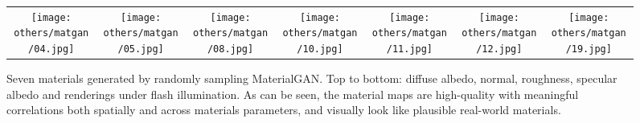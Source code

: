 \setlength{\resLen}{.13\columnwidth}
\begin{figure}[t]
	\addtolength{\tabcolsep}{-4pt}
	\begin{tabular}{ccccccc}
		\texttt{[image: others/matgan/04.jpg]} &
		\texttt{[image: others/matgan/05.jpg]} &
		\texttt{[image: others/matgan/08.jpg]} &
		\texttt{[image: others/matgan/10.jpg]} &
		\texttt{[image: others/matgan/11.jpg]} &
		\texttt{[image: others/matgan/12.jpg]} &
		\texttt{[image: others/matgan/19.jpg]}
	\end{tabular}
	\caption{Seven materials generated by randomly sampling MaterialGAN. Top to bottom: diffuse albedo, normal, roughness, specular albedo and renderings under flash illumination. As can be seen, the material maps are high-quality with meaningful correlations both spatially and across materials parameters, and visually look like plausible real-world materials.
	}
	\label{fig:material_gan_samples}
\end{figure}